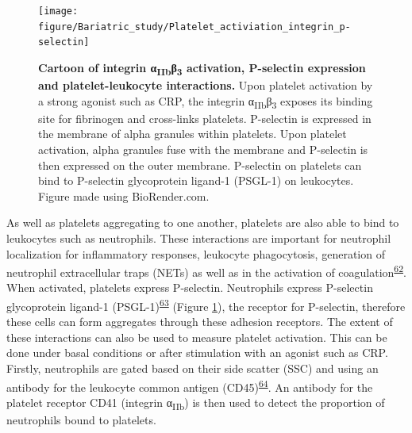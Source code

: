 \documentclass[11pt,twoside]{bristolthesis}
\begin{document}
\begin{figure}

{\centering \texttt{[image: figure/Bariatric\_study/Platelet\_activiation\_integrin\_p-selectin]} 

}

\caption[Cartoon of integrin α\textsubscript{IIb}β\textsubscript{3} activation, P-selectin expression and platelet-leukocyte interactions]{\textbf{Cartoon of integrin α\textsubscript{IIb}β\textsubscript{3} activation, P-selectin expression and platelet-leukocyte interactions.} Upon platelet activation by a strong agonist such as CRP, the integrin α\textsubscript{IIb}β\textsubscript{3} exposes its binding site for fibrinogen and cross-links platelets. P-selectin is expressed in the membrane of alpha granules within platelets. Upon platelet activation, alpha granules fuse with the membrane and P-selectin is then expressed on the outer membrane. P-selectin on platelets can bind to P-selectin glycoprotein ligand-1 (PSGL-1) on leukocytes. Figure made using BioRender.com.}\label{fig:platelet-activation-background}
\end{figure}
As well as platelets aggregating to one another, platelets are also able to bind to leukocytes such as neutrophils. These interactions are important for neutrophil localization for inflammatory responses, leukocyte phagocytosis, generation of neutrophil extracellular traps (NETs) as well as in the activation of coagulation\textsuperscript{\protect\hyperlink{ref-Lisman2018}{62}}. When activated, platelets express P-selectin. Neutrophils express P-selectin glycoprotein ligand-1 (PSGL-1)\textsuperscript{\protect\hyperlink{ref-Zarbock2007}{63}} (Figure \ref{fig:platelet-activation-background}), the receptor for P-selectin, therefore these cells can form aggregates through these adhesion receptors. The extent of these interactions can also be used to measure platelet activation. This can be done under basal conditions or after stimulation with an agonist such as CRP. Firstly, neutrophils are gated based on their side scatter (SSC) and using an antibody for the leukocyte common antigen (CD45)\textsuperscript{\protect\hyperlink{ref-Gerrits2016}{64}}. An antibody for the platelet receptor CD41 (integrin α\textsubscript{IIb}) is then used to detect the proportion of neutrophils bound to platelets.
\end{document}

